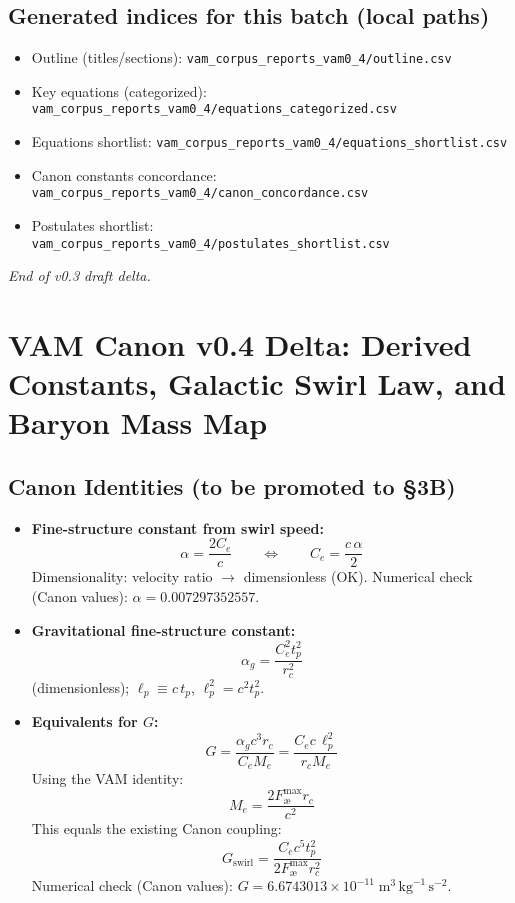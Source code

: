 \documentclass[11pt]{article}
\begin{document}
\subsection{Generated indices for this batch (local paths)}
\begin{itemize}
    \item Outline (titles/sections): \texttt{vam\_corpus\_reports\_vam0\_4/outline.csv}
    \item Key equations (categorized): \texttt{vam\_corpus\_reports\_vam0\_4/equations\_categorized.csv}
    \item Equations shortlist: \texttt{vam\_corpus\_reports\_vam0\_4/equations\_shortlist.csv}
    \item Canon constants concordance: \texttt{vam\_corpus\_reports\_vam0\_4/canon\_concordance.csv}
    \item Postulates shortlist: \texttt{vam\_corpus\_reports\_vam0\_4/postulates\_shortlist.csv}
\end{itemize}

\textit{End of v0.3 draft delta.}



\section{VAM Canon v0.4 Delta: Derived Constants, Galactic Swirl Law, and Baryon Mass Map}
\label{sec:vam-canon-v0.4-delta}

\subsection{Canon Identities (to be promoted to \S3B)}
\begin{itemize}
    \item \textbf{Fine-structure constant from swirl speed:}
    \[
        \boxed{\alpha = \frac{2 C_e}{c}} \qquad \Longleftrightarrow \qquad \boxed{C_e = \frac{c\,\alpha}{2}}
    \]
    Dimensionality: velocity ratio $\rightarrow$ dimensionless (OK). Numerical check (Canon values): $\alpha=0.007297352557$.

    \item \textbf{Gravitational fine-structure constant:}
    \[
        \boxed{\alpha_g = \frac{C_e^{2} t_p^{2}}{r_c^{2}}}
    \]
    (dimensionless); $\ell_p \equiv c\,t_p$, $\ell_p^{2}=c^{2}t_p^{2}$.

    \item \textbf{Equivalents for $G$:}
    \[
        \boxed{G = \frac{\alpha_g c^{3} r_c}{C_e M_e} = \frac{C_e c\, \ell_p^{2}}{r_c M_e}}
    \]
    Using the VAM identity:
    \[
        \boxed{M_e = \frac{2 F_{\text{\ae}}^{\max} r_c}{c^{2}}}
    \]
    This equals the existing Canon coupling:
    \[
        \boxed{G_{\text{swirl}}=\frac{C_e c^{5} t_p^{2}}{2 F_{\text{\ae}}^{\max} r_c^{2}}}
    \]
    Numerical check (Canon values): $G=6.6743013\times10^{-11}\;\text{m}^3\,\text{kg}^{-1}\,\text{s}^{-2}$.
\end{itemize}
\end{document}
